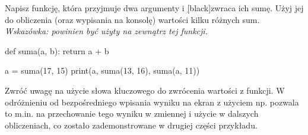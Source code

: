 % 
% 
% 
% 



\dbEntryCheckResults
Napisz funkcję, która przyjmuje dwa argumenty i \ul[black]{zwraca} ich sumę. Użyj jej do obliczenia (oraz wypisania na konsolę) wartości kilku różnych sum.
\\\textit{Wskazówka:  powinien być użyty na zewnątrz tej funkcji.}

\fi
{}\dbEntryCheckResults
\begin{CodeFrame*}[python]{}
def suma(a, b):
  return a + b

a = suma(17, 15)
print(a, suma(13, 16), suma(a, 11))
\end{CodeFrame*}
%
Zwróć uwagę na użycie słowa kluczowego  do zwrócenia wartości z funkcji.
W odróżnieniu od bezpośredniego wpisania wyniku na ekran z użyciem np.  pozwala to m.in. na przechowanie tego wyniku w zmiennej i użycie w dalszych obliczeniach,
co zostało zademonstrowane w drugiej części przykładu.
\fi



